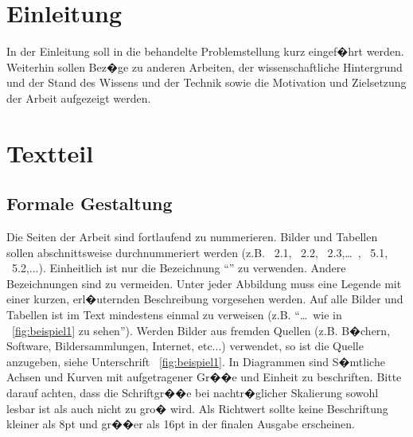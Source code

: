 \section{Einleitung}
In der Einleitung soll in die behandelte Problemstellung kurz eingef�hrt werden. Weiterhin
sollen Bez�ge zu anderen Arbeiten, der wissenschaftliche Hintergrund und der Stand des
Wissens und der Technik sowie die Motivation und Zielsetzung der Arbeit aufgezeigt werden.

\section{Textteil}
\subsection{Formale Gestaltung}
Die Seiten der Arbeit sind fortlaufend zu nummerieren. Bilder und Tabellen sollen abschnittsweise
durchnummeriert werden (z.B. \figurename~2.1, \figurename~2.2, \figurename~2.3,\ldots\ , \figurename~5.1, \figurename~5.2,...). Einheitlich
ist nur die Bezeichnung "`\figurename"' zu verwenden. Andere Bezeichnungen sind zu vermeiden. Unter jeder Abbildung muss eine Legende mit einer kurzen, erl�uternden Beschreibung
vorgesehen werden. Auf alle Bilder und Tabellen ist im Text mindestens einmal zu verweisen (z.B.
"`\ldots\  wie in \figurename~\ref{fig:beispiel1} zu sehen"'). Werden Bilder aus fremden Quellen (z.B. B�chern,
Software, Bildersammlungen, Internet, etc...) verwendet, so ist die Quelle  anzugeben, siehe
Unterschrift \figurename~\ref{fig:beispiel1}. In Diagrammen sind S�mtliche Achsen und Kurven mit
aufgetragener Gr��e und Einheit zu beschriften. Bitte darauf achten, dass die Schriftgr��e bei nachtr�glicher Skalierung sowohl lesbar ist als auch nicht zu gro� wird. Als Richtwert sollte keine Beschriftung kleiner als 8pt und gr��er als 16pt in der finalen Ausgabe erscheinen.

